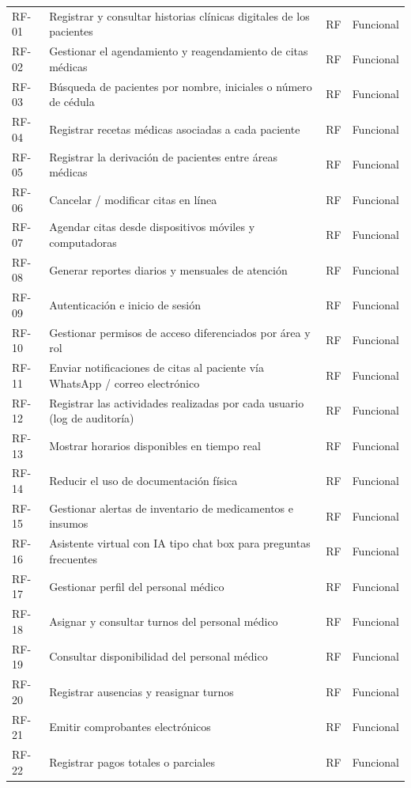 \documentclass[11pt,a4paper]{article}
\begin{document}
\begin{longtable}{p{} p{} p{} p{}}
		\bottomrule
		\endlastfoot
		RF-01 & Registrar y consultar historias clínicas digitales de los pacientes & RF & Funcional \\
		RF-02 & Gestionar el agendamiento y reagendamiento de citas médicas & RF & Funcional \\
		RF-03 & Búsqueda de pacientes por nombre, iniciales o número de cédula & RF & Funcional \\
		RF-04 & Registrar recetas médicas asociadas a cada paciente & RF & Funcional \\
		RF-05 & Registrar la derivación de pacientes entre áreas médicas & RF & Funcional \\
		RF-06 & Cancelar / modificar citas en línea & RF & Funcional \\
		RF-07 & Agendar citas desde dispositivos móviles y computadoras & RF & Funcional \\
		RF-08 & Generar reportes diarios y mensuales de atención & RF & Funcional \\
		RF-09 & Autenticación e inicio de sesión & RF & Funcional \\
		RF-10 & Gestionar permisos de acceso diferenciados por área y rol & RF & Funcional \\
		RF-11 & Enviar notificaciones de citas al paciente vía WhatsApp / correo electrónico & RF & Funcional \\
		RF-12 & Registrar las actividades realizadas por cada usuario (log de auditoría) & RF & Funcional \\
		RF-13 & Mostrar horarios disponibles en tiempo real & RF & Funcional \\
		RF-14 & Reducir el uso de documentación física & RF & Funcional \\
		RF-15 & Gestionar alertas de inventario de medicamentos e insumos & RF & Funcional \\
		RF-16 & Asistente virtual con IA tipo chat box para preguntas frecuentes & RF & Funcional \\
		RF-17 & Gestionar perfil del personal médico & RF & Funcional \\
		RF-18 & Asignar y consultar turnos del personal médico & RF & Funcional \\
		RF-19 & Consultar disponibilidad del personal médico & RF & Funcional \\
		RF-20 & Registrar ausencias y reasignar turnos & RF & Funcional \\
		RF-21 & Emitir comprobantes electrónicos & RF & Funcional \\
		RF-22 & Registrar pagos totales o parciales & RF & Funcional \\

\end{longtable}
\end{document}
